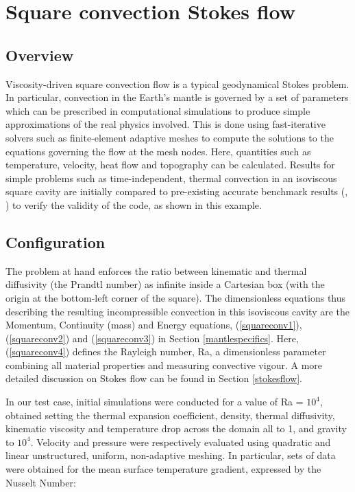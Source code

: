 \section{Square convection Stokes flow}
\label{sect:stokes_flow}

\subsection{Overview}
Viscosity-driven square convection flow is a typical geodynamical Stokes problem. In particular, convection in the Earth's mantle is governed by a set of parameters which can be prescribed in computational simulations to produce simple approximations of the real physics involved. This is done using fast-iterative solvers such as finite-element adaptive meshes to compute the solutions to the equations governing the flow at the mesh nodes. Here, quantities such as temperature, velocity, heat flow and topography can be calculated. Results for simple problems such as time-independent, thermal convection in an isoviscous square cavity are initially compared to pre-existing accurate benchmark results (\citep{blankenbach1989}, \citep{davies2007}) to verify the validity of the code, as shown in this example. 

\subsection{Configuration}
The problem at hand enforces the ratio between kinematic and thermal diffusivity (the Prandtl number) as infinite inside a Cartesian box (with the origin at the bottom-left corner of the square).
The dimensionless equations thus describing the resulting incompressible convection in this isoviscous cavity are the Momentum, Continuity (mass) and Energy equations, (\ref{squareconv1}), (\ref{squareconv2}) and (\ref{squareconv3}) in Section \ref{mantlespecifics}. Here, (\ref{squareconv4}) defines the Rayleigh number, Ra, a dimensionless parameter combining all material properties and measuring convective vigour. A more detailed discussion on Stokes flow can be found in Section \ref{stokesflow}.

In our test case, initial simulations were conducted for a value of Ra = $10^4$, obtained setting the thermal expansion coefficient, density, thermal diffusivity, kinematic viscosity and temperature drop across the domain all to 1, and gravity to $10^4$. Velocity and pressure were respectively evaluated using quadratic and linear unstructured, uniform, non-adaptive meshing. In particular, sets of data were obtained for the mean surface temperature gradient, expressed by the Nusselt Number:

